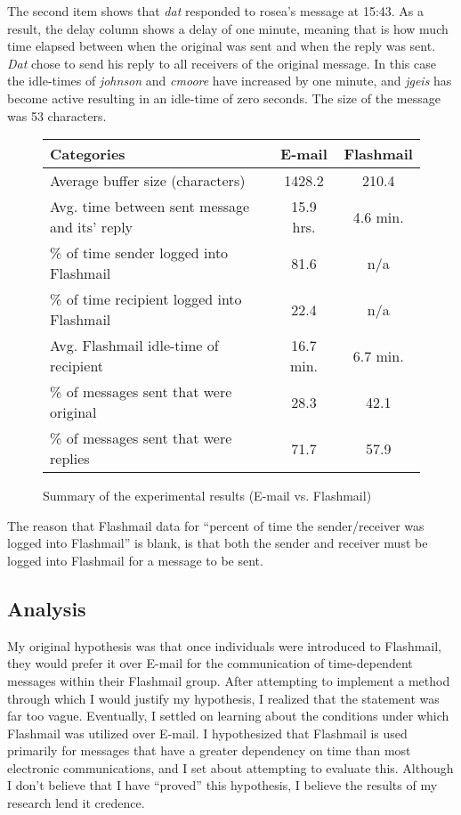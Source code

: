 The second item shows that \textit{dat} responded to rosea's message at 15:43.  As a
result, the delay column shows a delay of one minute, meaning that is how
much time elapsed between when the original was sent and when the reply was
sent. \textit{Dat} chose to send his reply to all receivers of the original message.
In this case the idle-times of
\textit{johnson} and \textit{cmoore} have increased by one minute, and \textit{jgeis} has become
active resulting in an idle-time of zero seconds.  The size of the message
was 53 characters.

\begin{figure}[htpb]
 \caption{Summary of the experimental results (E-mail vs. Flashmail)}
  \begin{center}
  \begin{tabular}{|l|c|c|}
    \hline Categories & E-mail & Flashmail \\ \hline Average buffer size
    (characters)& 1428.2 & 210.4 \\ Avg. time between sent message and its'
    reply & 15.9 hrs.  & 4.6 min.  \\ \% of time sender logged into
    Flashmail & 81.6 & n/a \\ \% of time recipient logged into Flashmail &
    22.4 & n/a \\ Avg. Flashmail idle-time of recipient & 16.7 min.  & 6.7
    min.  \\ \% of messages sent that were original & 28.3 & 42.1 \\ \% of
    messages sent that were replies & 71.7 & 57.9 \\ \hline
   \end{tabular}
  \end{center}
 \label{results}
\end{figure}

The reason that Flashmail data for ``percent of time the sender/receiver
was logged into Flashmail'' is blank, is that both the sender and receiver
must be logged into Flashmail for a message to be sent.

\subsection{Analysis}

My original hypothesis was that once individuals were introduced to
Flashmail, they would prefer it over E-mail for the communication of
time-dependent messages within their Flashmail group.  After attempting to
implement a method through which I would justify my hypothesis, I realized
that the statement was far too vague.  Eventually, I settled on learning
about the conditions under which Flashmail was utilized over E-mail.  I
hypothesized that Flashmail is used primarily for messages that have a greater
dependency on time than most electronic communications, and I set about
attempting to evaluate this.  Although I don't believe that I have ``proved''
this hypothesis, I believe the results of my research lend it credence.

